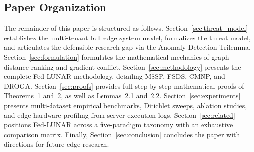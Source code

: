 \subsection{Paper Organization}
The remainder of this paper is structured as follows. Section~\ref{sec:threat_model} establishes the multi-tenant IoT edge system model, formalizes the threat model, and articulates the defensible research gap via the Anomaly Detection Trilemma. Section~\ref{sec:formulation} formulates the mathematical mechanics of graph distance-ranking and gradient conflict. Section~\ref{sec:methodology} presents the complete Fed-LUNAR methodology, detailing MSSP, FSDS, CMNP, and DROGA. Section~\ref{sec:proofs} provides full step-by-step mathematical proofs of Theorems~1 and~2, as well as Lemmas~2.1 and~2.2. Section~\ref{sec:experiments} presents multi-dataset empirical benchmarks, Dirichlet sweeps, ablation studies, and edge hardware profiling from server execution logs. Section~\ref{sec:related} positions Fed-LUNAR across a five-paradigm taxonomy with an exhaustive comparison matrix. Finally, Section~\ref{sec:conclusion} concludes the paper with directions for future edge research.
